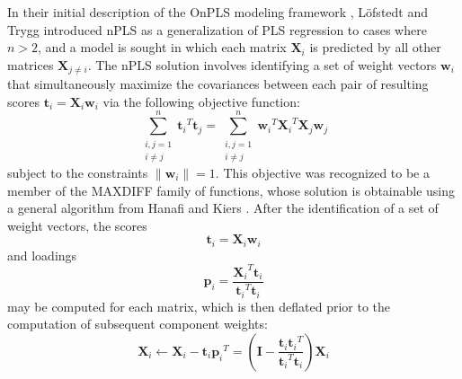 \begin{doublespace}
In their initial description of the OnPLS modeling framework
\cite{lofstedt:jchemo2011}, L\"{o}fstedt and Trygg introduced nPLS as a
generalization of PLS regression to cases where $n>2$, and a model is
sought in which each matrix $\mathbf{X}_i$ is predicted by all other
matrices $\mathbf{X}_{j \ne i}$. The nPLS solution involves identifying
a set of weight vectors $\mathbf{w}_i$ that simultaneously maximize the
covariances between each pair of resulting scores
$\mathbf{t}_i = \mathbf{X}_i \mathbf{w}_i$ via the following objective
function:
\begin{equation}
\sum_{\substack{i,j=1\\ i \ne j}}^n
 {\mathbf{t}_i}^T \mathbf{t}_j =
\sum_{\substack{i,j=1\\ i \ne j}}^n
 {\mathbf{w}_i}^T {\mathbf{X}_i}^T \mathbf{X}_j \mathbf{w}_j
\end{equation}
subject to the constraints $\|\mathbf{w}_i\|=1$. This objective was recognized
to be a member of the MAXDIFF family of functions, whose solution is obtainable
using a general algorithm from Hanafi and Kiers \cite{hanafi:csda2006}. After
the identification of a set of weight vectors, the scores
\begin{equation*}
\mathbf{t}_i = \mathbf{X}_i \mathbf{w}_i
\end{equation*}
and loadings
\begin{equation*}
\mathbf{p}_i = \frac{{\mathbf{X}_i}^T \mathbf{t}_i}
                    {{\mathbf{t}_i}^T \mathbf{t}_i}
\end{equation*}
may be computed for each matrix, which is then deflated prior to the
computation of subsequent component weights:
\begin{equation}
\mathbf{X}_i \gets \mathbf{X}_i - \mathbf{t}_i {\mathbf{p}_i}^T =
 \left( \mathbf{I} - \frac{\mathbf{t}_i {\mathbf{t}_i}^T}
                          {{\mathbf{t}_i}^T \mathbf{t}_i}
 \right) \mathbf{X}_i
\end{equation}


\end{doublespace}
